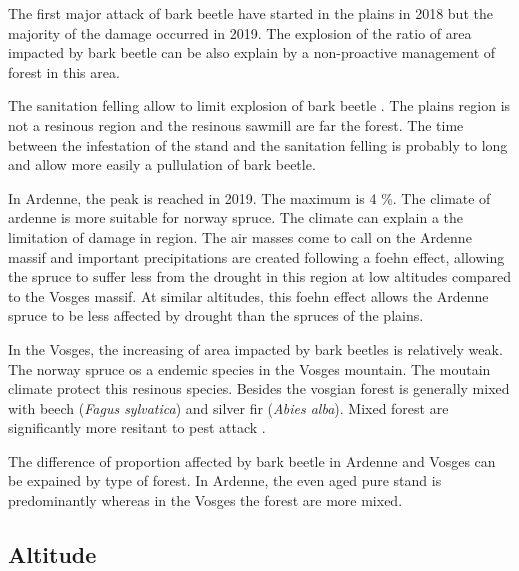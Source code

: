 \documentclass[3p,procedia]{elsarticle}
\begin{document}
The first major attack of bark beetle have started in the plains in 2018 but the majority of the damage occurred in 2019. 
The explosion of the ratio of area impacted by bark beetle can be also explain by a non-proactive management of forest in this area.

The sanitation felling allow to limit explosion of bark beetle \citep{stadelmann_effects_2013}.
The plains region is not a resinous region and the resinous sawmill are far the forest. 
The time between the infestation of the stand and the sanitation felling is probably to long and allow more easily a pullulation of bark beetle.

In Ardenne, the peak is reached in 2019. The maximum is 4 \%. The climate of ardenne is more suitable for norway spruce. 
The climate can explain a the limitation of damage in region. 
The air masses come to call on the Ardenne massif and important precipitations are created following a foehn effect, allowing the spruce to suffer less from the drought in this region at low altitudes compared to the Vosges massif. 
At similar altitudes, this foehn effect allows the Ardenne spruce to be less affected by drought than the spruces of the plains.

In the Vosges, the increasing of area impacted by bark beetles is relatively weak.
The norway spruce os a endemic species in the Vosges mountain. 
The moutain climate protect this resinous species. 
Besides the vosgian forest is generally mixed with beech (\textit{Fagus sylvatica}) and  silver fir (\textit{Abies alba}). Mixed forest are significantly more resitant to pest attack \citep{jactel_2021}. 

The difference of proportion affected by bark beetle in Ardenne and Vosges can be expained by type of forest.
In Ardenne, the even aged pure stand is predominantly whereas in the Vosges  the forest are more mixed. 

\subsection{Altitude}
\end{document}
